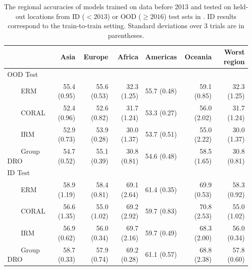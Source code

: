 \begin{table}[!h]
  \caption{The regional accuracies of models trained on data before 2013 and tested on held-out locations from ID ($< 2013$) or OOD ($\geq 2016$) test sets in \FMoW. ID results correspond to the train-to-train setting. Standard deviations over 3 trials are in parentheses.}
  \centering
\begin{tabular} {l r r r r r r}
\toprule
& Asia & Europe & Africa & Americas & Oceania & Worst region\\
\midrule
OOD Test & & & & & & \\
~~~~ERM & 55.4 (0.95) & 55.6 (0.53) & 32.3 (1.25) & 55.7 (0.48) & 59.1 (0.85) & 32.3 (1.25)  \\
~~~~CORAL & 52.4 (0.96) & 52.6 (0.82) & 31.7 (1.24) & 53.3 (0.27) & 56.0 (2.02) & 31.7 (1.24)\\
~~~~IRM & 52.9 (0.73) & 53.9 (0.28) & 30.0 (1.37) & 53.7 (0.51) & 55.0 (2.22) & 30.0 (1.37)\\
~~~~Group DRO  & 54.7 (0.52) & 55.1 (0.39) & 30.8 (0.81) & 54.6 (0.48) & 58.5 (1.65) & 30.8 (0.81) \\
ID Test & & & & & & \\
~~~~ERM & 58.9 (1.19) & 58.4 (0.81) & 69.1 (2.64) & 61.4 (0.35) & 69.9 (0.53) & 58.3 (0.92)\\
~~~~CORAL & 56.6 (1.35) & 55.0 (1.02) & 69.2 (2.92) & 59.7 (0.83) & 70.8 (2.53) & 55.0 (1.02)\\
~~~~IRM & 56.9 (0.62) & 56.0 (0.34) & 69.7 (2.16) & 59.7 (0.49) & 68.3 (2.00) & 56.0 (0.34)\\
~~~~Group DRO  & 58.7 (0.33) & 57.9 (0.74) & 69.2 (0.28) & 61.1 (0.57) & 68.8 (2.38) & 57.8 (0.60) \\
\bottomrule
\end{tabular}
\label{table:fmow-region}
\end{table}


